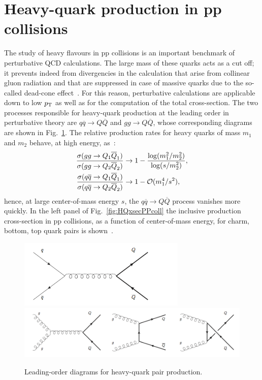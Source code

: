 \section{Heavy-quark production in pp collisions}
\label{sec:HFpp}
The study of heavy flavours in pp collisions is an 
important benchmark of perturbative QCD calculations. 
The large mass of these quarks acts as a cut off; it prevents 
indeed from divergencies in the calculation that arise
from collinear gluon radiation and that are suppressed 
in case of massive quarks due to the
so-called dead-cone effect~\cite{Dokshitzer:1991fd}. 
For this reason, perturbative calculations are applicable down to low $p_{\rm T}$ 
as well as for the computation of the total cross-section. 
The two processes responsible for heavy-quark production 
at the leading order in perturbative theory are 
$q \overline{q} \rightarrow Q \overline{Q}$ and $gg \rightarrow Q \overline{Q}$, 
whose corresponding diagrams are
shown in Fig.~\ref{fig:LOdiagrams}. The relative production 
rates for heavy quarks of mass 
$m_1$ and $m_2$ behave, at high energy, as~\cite{Mangano:1997ri}:
\begin{equation}
\begin{aligned}
\frac{\sigma (gg \rightarrow Q_1 \overline{Q}_1)}{\sigma (gg \rightarrow Q_2 \overline{Q}_2)} & \rightarrow 1 - \frac{{\rm log}(m_1^2/m_2^2)}{{\rm log}(s/m_2^2)}, \\
\frac{\sigma (q \overline{q} \rightarrow Q_1 \overline{Q}_1)}{\sigma (q \overline{q} \rightarrow Q_2 \overline{Q}_2)} & \rightarrow 1 - \mathcal{O} (m_1^4/s^2),
\end{aligned}
\end{equation}
hence, at large center-of-mass energy $s$, the 
$q \overline{q} \rightarrow Q \overline{Q}$ process
vanishes more quickly. In the left panel of Fig.~\ref{fig:HQxsecPPcoll}
 the inclusive production cross-section in pp collisions,
as a function of center-of-mass energy, for charm, bottom, 
top quark pairs is shown~\cite{Mangano:1997ri}.
\begin{figure}[!ht]
  \centering
  \includegraphics[width=8cm]{FigCap2/Feymann1.png}
  \includegraphics[width=15cm]{FigCap2/Feymann2.png}
  \caption{Leading-order diagrams for heavy-quark pair production.}
  \label{fig:LOdiagrams}
\end{figure}
